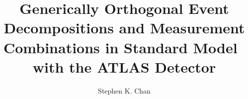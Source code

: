 \title{Generically Orthogonal Event Decompositions and Measurement Combinations in Standard Model \vhbb\, with the ATLAS Detector}
\author{Stephen K. Chan}





\degreemonth{}


